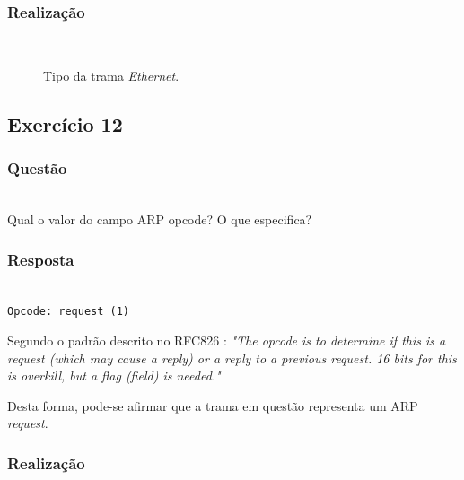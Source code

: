 \documentclass{llncs}
\begin{document}
\subsubsection{Realização}\rule[-10pt]{0pt}{10pt}\\

\begin{figure}
	\caption{Tipo da trama \textit{Ethernet}.}
	\label{fig:arp_request_type}
\end{figure} 


\clearpage
\subsection{Exercício 12}
\subsubsection{Questão}\rule[-10pt]{0pt}{10pt}\\

Qual o valor do campo ARP opcode? O que especifica?

\subsubsection{Resposta}\rule[-10pt]{0pt}{10pt}\\

\texttt{Opcode: request (1)}

Segundo o padrão descrito no RFC826 \cite{RFC0826}:
	\emph{"The opcode is to determine if this is a request (which may cause a reply) or a reply to a previous request.  16 bits for this is overkill, but a flag (field) is needed."}

Desta forma, pode-se afirmar que a trama em questão representa um ARP \textit{request}.

\subsubsection{Realização}\rule[-10pt]{0pt}{10pt}\\
\end{document}
